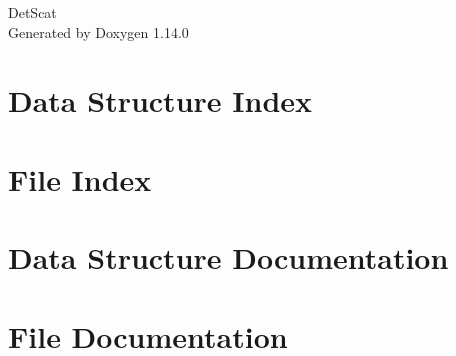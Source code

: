\documentclass[twoside]{book}
\newcommand{\+}{\discretionary{\mbox{\scriptsize$\hookleftarrow$}}{}{}}
\newcommand{\clearemptydoublepage}{%
    \newpage{\pagestyle{empty}\cleardoublepage}%
  }
\begin{document}
  \raggedbottom
    \hypersetup{pageanchor=false,
                bookmarksnumbered=true,
                pdfencoding=unicode
               }
  \begin{titlepage}
  \vspace*{7cm}
  \begin{center}%
  {\Large Det\+Scat}\\
  \vspace*{1cm}
  {\large Generated by Doxygen 1.14.0}\\
  \end{center}
  \end{titlepage}
  \clearemptydoublepage
  \tableofcontents
  \clearemptydoublepage
  \hypersetup{pageanchor=true}

\chapter{Data Structure Index}

\chapter{File Index}

\chapter{Data Structure Documentation}


\chapter{File Documentation}



  \backmatter
  \newpage
  \clearemptydoublepage
  \printindex
\end{document}
